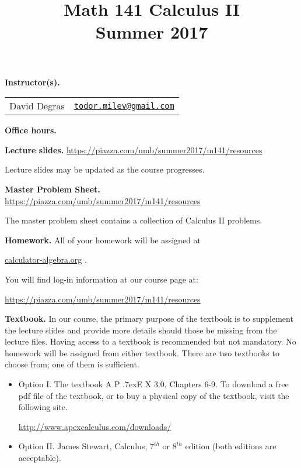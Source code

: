 \documentclass{article}
\title{Math 141 Calculus II \\ Summer 2017}
\date{}
\newcommand{\apex}{A\kern -1pt \lower -2pt\hbox{P}\kern -4pt \lower .7ex\hbox{E}\kern -1pt X}
\newcommand{\websitebase}{https://piazza.com/umb/summer2017/m141}
\begin{document}
\maketitle

\noindent \textbf{Instructor(s).} 
\begin{tabular}{ll}
David Degras & \href{mailto:todor.milev@gmail.com}{\nolinkurl{todor.milev@gmail.com}} 
\end{tabular}

\medskip
\noindent \textbf{Office hours. } 





\medskip \noindent \textbf{Lecture slides. }  \url{\websitebase/resources}

\medskip\noindent Lecture slides may be updated as the course progresses.


\medskip \noindent \textbf{Master Problem Sheet. }  \url{\websitebase/resources} 

\medskip\noindent The master problem sheet contains a collection of Calculus II problems. 

\medskip
\noindent \textbf{Homework.} All of your homework will be assigned at 

\url{calculator-algebra.org} \quad \quad \quad .

You will find log-in information at our course page at:

\url{\websitebase/resources}

\medskip\noindent \textbf{Textbook. } In our course, the primary purpose of the textbook is to supplement the lecture slides and provide more details should those be missing from the lecture files. Having access to a textbook is recommended but not mandatory.  No homework will be assigned from either textbook. There are two textbooks to choose from; one of them is sufficient.

\begin{itemize}
\item Option I. The textbook \apex{} 3.0, Chapters 6-9. To download a free pdf file of the textbook, or to buy a physical copy of the textbook, visit the following site.

\url{http://www.apexcalculus.com/downloads/} 
\item Option II. James Stewart, Calculus, $7^{th}$ or $8^{th}$ edition (both editions are acceptable).
\end{itemize}
\end{document}
